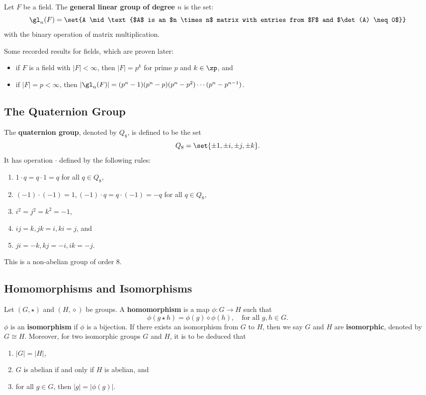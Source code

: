  Let $F$ be a field. The \textbf{general linear group of degree $n$} is the set:
\[\gl_n(F) = \set{A \mid \text{$A$ is an $n \times n$ matrix with entries from $F$ and $\det(A) \neq 0$}}\]
with the binary operation of matrix multiplication.

\note Some recorded results for fields, which are proven later:
\begin{itemize}
    \item if $F$ is a field with $|F| < \infty$, then $|F| = p^k$ for prime $p$ and $k \in \zp$, and
    \item if $|F| = p < \infty$, then $|\gl_n(F)| = (p^n - 1)(p^n - p)(p^n - p^2) \cdots (p^n - p^{n - 1})$.
\end{itemize}

\subsection{The Quaternion Group} \label{sec1.5}

 The \textbf{quaternion group}, denoted by $Q_8$, is defined to be the set
\[Q_8 = \set{\pm 1, \pm i, \pm j, \pm k}.\]
It has operation $\cdot$ defined by the following rules:
\begin{enumerate}
    \item $1 \cdot q = q \cdot 1 = q$ for all $q \in Q_8$,
    \item $(-1) \cdot (-1) = 1, (-1) \cdot q = q \cdot (-1) = -q$ for all $q \in Q_8$,
    \item $i^2 = j^2 = k^2 = -1$,
    \item $ij = k, jk = i, ki = j$, and
    \item $ji = -k, kj = -i, ik = -j$.
\end{enumerate}
This is a non-abelian group of order 8.

\subsection{Homomorphisms and Isomorphisms} \label{sec1.6}

 Let $(G, \star)$ and $(H, \diamond)$ be groups. A \textbf{homomorphism} is a map $\phi : G \to H$ such that
\[\phi(g \star h) = \phi(g) \diamond \phi(h), \quad \text{for all $g, h \in G$}.\]
$\phi$ is an \textbf{isomorphism} if $\phi$ is a bijection. If there exists an isomorphism from $G$ to $H$, then we say $G$ and $H$ are \textbf{isomorphic}, denoted by $G \cong H$. Moreover, for two isomorphic groups $G$ and $H$, it is to be deduced that
\begin{enumerate}
    \item $|G| = |H|$,
    \item $G$ is abelian if and only if $H$ is abelian, and
    \item for all $g \in G$, then $|g| = |\phi(g)|$.
\end{enumerate}

